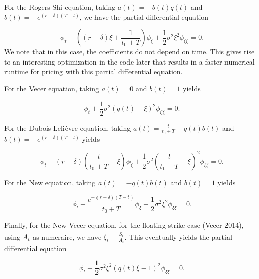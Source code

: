 \documentclass{article}
\begin{document}
For the Rogers-Shi equation, taking \(a(t)\) = \(-b(t)q(t)\) and \(b(t) = -e^{(r-\delta)(T-t)}\), we have the partial differential equation

\begin{equation}
  \phi_t - ( (r-\delta)\xi + \frac{1}{t_0 + T} )\phi_\xi + \frac{1}{2}\sigma^2\xi^2\phi_{\xi\xi} = 0.
\end{equation}We note that in this case, the coefficients do not depend on time. This gives rise to an interesting optimization in the code later that results in a faster numerical runtime for pricing with this partial differential equation.

For the Vecer equation, taking \(a(t) = 0\) and \(b(t)=1\) yields

\begin{equation}
  \phi_t + \frac{1}{2}\sigma^2(q(t) - \xi)^2\phi_{\xi\xi} = 0.
\end{equation}

For the Dubois-Leli\`{e}vre equation, taking \(a(t) = \frac{t}{t_0 + T} - q(t)b(t)\) and \(b(t)=-e^{(r-\delta)(T-t)}\) yields

\begin{equation}
  \phi_t + (r-\delta)(\frac{t}{t_0 + T} - \xi)\phi_\xi + \frac{1}{2}\sigma^2(\frac{t}{t_0 + T} - \xi)^2\phi_{\xi\xi} = 0.
\end{equation}

For the New equation, taking \(a(t) = -q(t)b(t)\) and \(b(t) = 1\) yields

\begin{equation}
  \phi_t + \frac{e^{-(r-\delta)(T-t)}}{t_0 + T}\phi_\xi + \frac{1}{2}\sigma^2\xi^2\phi_{\xi\xi} = 0.
\end{equation}

Finally, for the New Vecer equation, for the floating strike case (Vecer 2014), using \(A_t\) as numeraire, we have \(\xi_t = \frac{\tilde{S}_t}{A_t}\). This eventually yields the partial differential equation %

\begin{equation}
  \phi_t + \frac{1}{2}\sigma^2\xi^2(q(t)\xi - 1)^2 \phi_{\xi\xi} = 0.
\end{equation}
\end{document}
